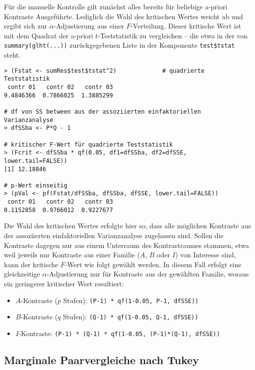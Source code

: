 Für die manuelle Kontrolle gilt zunächst alles bereits für beliebige a-priori Kontraste Ausgeführte. Lediglich die Wahl des kritischen Wertes weicht ab und ergibt sich zur $\alpha$-Adjustierung aus einer $F$-Verteilung. Dieser kritische Wert ist mit dem Quadrat der a-priori $t$-Teststatistik zu vergleichen -- die etwa in der von \lstinline!summary(glht(...))! zurückgegebenen Liste in der Komponente \lstinline!test$tstat! steht.
\begin{lstlisting}
> (Fstat <- sumRes$test$tstat^2)             # quadrierte Teststatistik
 contr 01   contr 02   contr 03
9.4846366  0.7866025  1.3885299

# df von SS between aus der assoziierten einfaktoriellen Varianzanalyse
> dfSSba <- P*Q - 1

# kritischer F-Wert für quadrierte Teststatistik
> (Fcrit <- dfSSba * qf(0.05, df1=dfSSba, df2=dfSSE, lower.tail=FALSE))
[1] 12.18846

# p-Wert einseitig
> (pVal <- pf(Fstat/dfSSba, dfSSba, dfSSE, lower.tail=FALSE))
 contr 01   contr 02   contr 03
0.1152858  0.9766012  0.9227677
\end{lstlisting}

Die Wahl des kritischen Wertes erfolgte hier so, dass alle möglichen Kontraste aus der assoziierten einfaktoriellen Varianzanalyse zugelassen sind. Sollen die Kontraste dagegen nur aus einem Unterraum des Kontrastraumes stammen, etwa weil jeweils nur Kontraste aus einer Familie ($A$, $B$ oder $I$) von Interesse sind, kann der kritische $F$-Wert wie folgt gewählt werden. In diesem Fall erfolgt eine gleichzeitige $\alpha$-Adjustierung nur für Kontraste aus der gewählten Familie, woraus ein geringerer kritischer Wert resultiert:
\begin{itemize}
\item $A$-Kontraste ($p$ Stufen): \lstinline!(P-1) * qf(1-0.05, P-1, dfSSE))!
\item $B$-Kontraste ($q$ Stufen): \lstinline!(Q-1) * qf(1-0.05, Q-1, dfSSE))!
\item $I$-Kontraste: \lstinline!(P-1) * (Q-1) * qf(1-0.05, (P-1)*(Q-1), dfSSE))!
\end{itemize}

\subsection{Marginale Paarvergleiche nach Tukey}


